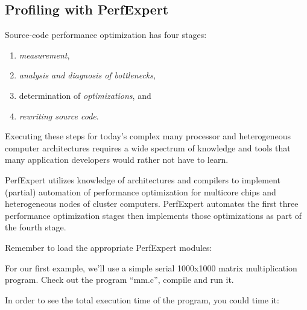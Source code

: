 \begin{prompt}
\end{prompt}

\subsection{Profiling with PerfExpert}
\label{subsec:Profiling_with_PerfExpert}

Source-code performance optimization has four stages:

\begin{enumerate}
  \item  \emph{measurement},
  \item  \emph{analysis and diagnosis of bottlenecks,}
  \item  determination of \emph{optimizations}, and
  \item  \emph{rewriting source code}.
\end{enumerate}

Executing these steps for today's complex many processor and heterogeneous computer architectures requires a wide spectrum of knowledge and tools that many application developers would rather not have to learn.

PerfExpert utilizes knowledge of architectures and compilers to implement (partial) automation of performance optimization for multicore chips and heterogeneous nodes of cluster computers. PerfExpert automates the first three performance optimization stages then implements those optimizations as part of the fourth stage.

Remember to load the appropriate PerfExpert modules:

\iftacc
\begin{prompt}
\end{prompt}
\fi
\ifvsc
\begin{prompt}
\end{prompt}
\fi

For our first example, we'll use a simple serial 1000x1000 matrix multiplication program. Check out the program ``mm.c'', compile and run it.

\begin{prompt}
\end{prompt}

In order to see the total execution time of the program, you could time it:

